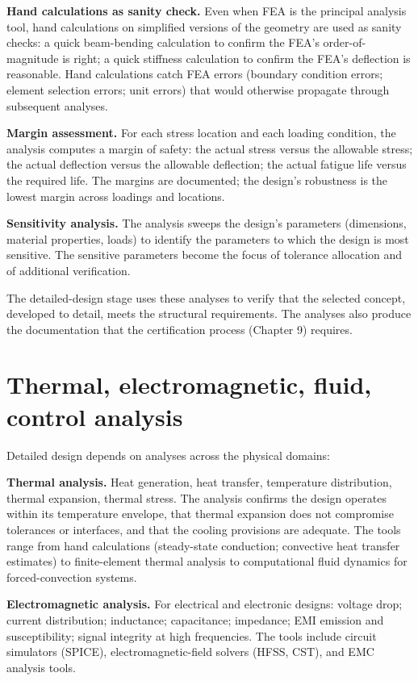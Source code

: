 \textbf{Hand calculations as sanity check.} Even when FEA is the principal analysis tool, hand calculations on simplified versions of the geometry are used as sanity checks: a quick beam-bending calculation to confirm the FEA's order-of-magnitude is right; a quick stiffness calculation to confirm the FEA's deflection is reasonable. Hand calculations catch FEA errors (boundary condition errors; element selection errors; unit errors) that would otherwise propagate through subsequent analyses.

\textbf{Margin assessment.} For each stress location and each loading condition, the analysis computes a margin of safety: the actual stress versus the allowable stress; the actual deflection versus the allowable deflection; the actual fatigue life versus the required life. The margins are documented; the design's robustness is the lowest margin across loadings and locations.

\textbf{Sensitivity analysis.} The analysis sweeps the design's parameters (dimensions, material properties, loads) to identify the parameters to which the design is most sensitive. The sensitive parameters become the focus of tolerance allocation and of additional verification.

The detailed-design stage uses these analyses to verify that the selected concept, developed to detail, meets the structural requirements. The analyses also produce the documentation that the certification process (Chapter 9) requires.

\section{Thermal, electromagnetic, fluid, control analysis}

Detailed design depends on analyses across the physical domains:

\textbf{Thermal analysis.} Heat generation, heat transfer, temperature distribution, thermal expansion, thermal stress. The analysis confirms the design operates within its temperature envelope, that thermal expansion does not compromise tolerances or interfaces, and that the cooling provisions are adequate. The tools range from hand calculations (steady-state conduction; convective heat transfer estimates) to finite-element thermal analysis to computational fluid dynamics for forced-convection systems.

\textbf{Electromagnetic analysis.} For electrical and electronic designs: voltage drop; current distribution; inductance; capacitance; impedance; EMI emission and susceptibility; signal integrity at high frequencies. The tools include circuit simulators (SPICE), electromagnetic-field solvers (HFSS, CST), and EMC analysis tools.

